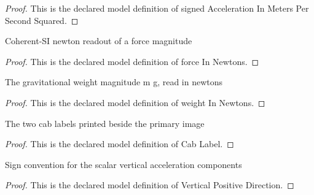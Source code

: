 \begin{proof}
  This is the declared model definition of signed Acceleration In Meters Per Second Squared.
\end{proof}
\begin{definition}
  \label{def:physics:phyx-mini-0762:phyxminiproblems-problemphyxmini0762-forceinnewtons}
  Coherent-SI newton readout of a force magnitude
\end{definition}
\begin{proof}
  This is the declared model definition of force In Newtons.
\end{proof}
\begin{definition}
  \label{def:physics:phyx-mini-0762:phyxminiproblems-problemphyxmini0762-weightinnewtons}
  The gravitational weight magnitude m g, read in newtons
\end{definition}
\begin{proof}
  This is the declared model definition of weight In Newtons.
\end{proof}
\begin{definition}
  \label{def:physics:phyx-mini-0762:phyxminiproblems-problemphyxmini0762-cablabel}
  The two cab labels printed beside the primary image
\end{definition}
\begin{proof}
  This is the declared model definition of Cab Label.
\end{proof}
\begin{definition}
  \label{def:physics:phyx-mini-0762:phyxminiproblems-problemphyxmini0762-verticalpositivedirection}
  Sign convention for the scalar vertical acceleration components
\end{definition}
\begin{proof}
  This is the declared model definition of Vertical Positive Direction.
\end{proof}

